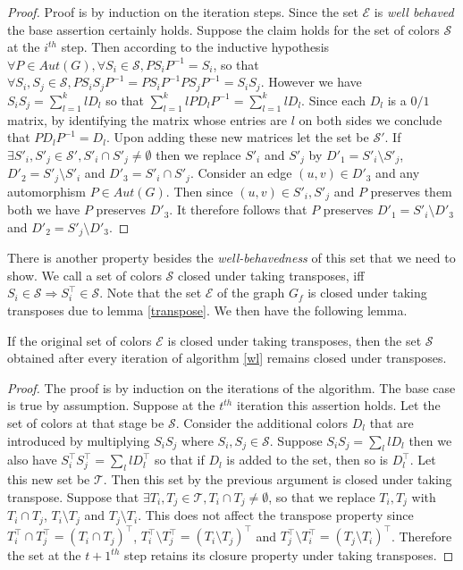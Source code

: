 \begin{proof}
	Proof is by induction on the iteration steps. Since the set $\mathcal{E}$ is \emph{well behaved} the base assertion certainly holds. Suppose the claim holds for the set of colors $\mathcal{S}$ at the $i^{th}$ step. 
	Then according to the inductive hypothesis $\forall P\in Aut(G),\forall S_i \in \mathcal{S}, PS_iP^{-1}=S_i$, so that $\forall S_i,S_j \in \mathcal{S}, PS_iS_jP^{-1}=PS_iP^{-1}PS_jP^{-1}=S_iS_j$. However we have
	$S_iS_j = \sum_{l=1}^k lD_l$ so that $\sum_{l=1}^k lPD_lP^{-1}=\sum_{l=1}^klD_l$. Since each $D_l$ is a $0/1$ matrix, by identifying the matrix whose entries are $l$ on both sides we conclude that $PD_lP^{-1}=D_l$.
	Upon adding these new matrices let the set be $\mathcal{S}'$. If $\exists S'_i,S'_j \in \mathcal{S}',S'_i \cap S'_j\neq \emptyset$ then we replace $S'_i$
	 and $S'_j$ by $D'_1=S'_i\setminus S'_j$, $D'_2=S'_j\setminus S'_i$ and 
	$D'_3=S'_i\cap S'_j$. Consider an edge $(u,v) \in D'_3$ and any automorphism $P \in Aut(G)$. Then since $(u,v) \in S'_i,S'_j$ and $P$ preserves them both we have $P$ preserves $D'_3$. It therefore follows that $P$
	preserves $D'_1=S'_i\setminus D'_3$ and $D'_2=S'_j\setminus D'_3$.
\end{proof}

There is another property besides the \emph{well-behavedness} of this set that we need to show. We call a set of colors $\mathcal{S}$ closed under taking transposes, iff $S_i \in \mathcal{S} \Rightarrow S_i^\top \in \mathcal{S}$.
Note that the set $\mathcal{E}$ of the graph $G_f$ is closed under taking transposes due to lemma \ref{transpose}. We then have the following lemma.

\begin{lemma}\label{transposepol}
	If the original set of colors $\mathcal{E}$ is closed under taking transposes, then the set $\mathcal{S}$ obtained after every iteration of algorithm \ref{wl} remains closed under transposes.
\end{lemma}

\begin{proof}
	The proof is by induction on the iterations of the algorithm. The base case is true by assumption. Suppose at the $t^{th}$ iteration this assertion holds. Let the set of colors at that stage be 
	$\mathcal{S}$. Consider the additional colors $D_l$ that are introduced by multiplying $S_iS_j$ where $S_i,S_j \in \mathcal{S}$. Suppose 
	$S_iS_j=\sum_{l}lD_l$ then we also have $S_i^\top S_j^\top=\sum_{l}lD_l^\top$ so that if $D_l$ is added to the set, then so is $D_l^\top$. Let this new set be $\mathcal{T}$. Then this set by the previous
	argument is closed under taking transpose. Suppose that $\exists T_i,T_j \in \mathcal{T},T_i \cap T_j \neq \emptyset$, so that we replace $T_i,T_j$ with $T_i \cap T_j$, $T_i \setminus T_j$ and $T_j \setminus T_i$.
	This does not affect the transpose property
	since $T_i^\top \cap T_j^\top= (T_i\cap T_j)^\top$, $T_i^\top \setminus T_j^\top = (T_i \setminus T_j)^\top$ and $T_j^\top \setminus T_i^\top = (T_j \setminus T_i)^\top$. Therefore the set at the $t+1^{th}$ step retains
	its closure property under taking transposes.
\end{proof}

